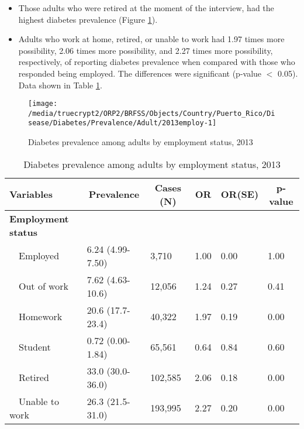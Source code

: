  
 \newpage
\begin{itemize}


\item Those adults who were 
retired at the moment of the interview, had the highest diabetes prevalence (Figure \ref{fig:employ.Diabetes.2013}).

\item Adults who work at home, retired, or unable to work had 1.97 times more possibility, 2.06 times more possibility, and 2.27 times more possibility, respectively, of reporting diabetes prevalence when compared with those who responded being employed. The differences were significant (p-value $<$ 0.05). 
Data shown in Table \ref{tab:employ.Diabetes.2013}.

\end{itemize}

\begin{figure}[H]
\caption{Diabetes prevalence among adults by employment status, 
         2013}
\label{fig:employ.Diabetes.2013}
\begin{knitrout}
\color{fgcolor}

{\centering \texttt{[image: /media/truecrypt2/ORP2/BRFSS/Objects/Country/Puerto\_Rico/Disease/Diabetes/Prevalence/Adult/2013employ-1]} 

}



\end{knitrout}
 \end{figure}

\begin{table}[H]
\caption{Diabetes prevalence  among adults by employment status, 2013\label{tab:employ.Diabetes.2013}} 
\begin{center}
\begin{tabular}{llllll}
\hline\hline
\multicolumn{1}{l}{Variables}&\multicolumn{1}{c}{Prevalence}&\multicolumn{1}{c}{Cases (N)}&\multicolumn{1}{c}{OR}&\multicolumn{1}{c}{OR(SE)}&\multicolumn{1}{c}{p-value}\tabularnewline
\hline
{\bfseries Employment status}&&&&&\tabularnewline
~~Employed&6.24 (4.99-7.50)&  3,710&1.00&0.00&1.00\tabularnewline
~~Out of work&7.62 (4.63-10.6)& 12,056&1.24&0.27&0.41\tabularnewline
~~Homework&20.6 (17.7-23.4)& 40,322&1.97&0.19&0.00\tabularnewline
~~Student&0.72 (0.00-1.84)& 65,561&0.64&0.84&0.60\tabularnewline
~~Retired&33.0 (30.0-36.0)&102,585&2.06&0.18&0.00\tabularnewline
~~Unable to work&26.3 (21.5-31.0)&193,995&2.27&0.20&0.00\tabularnewline
\hline
\end{tabular}\end{center}

\end{table}


